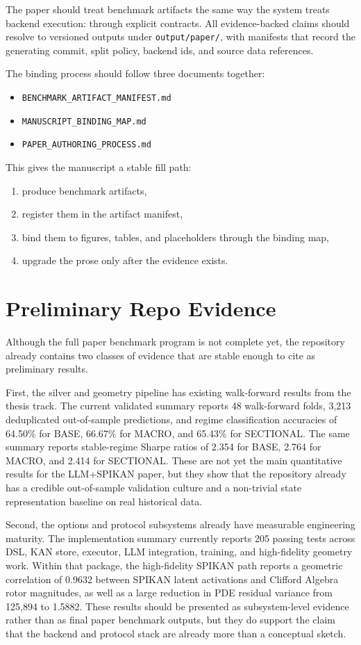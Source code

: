 \documentclass[11pt]{article}
\begin{document}
The paper should treat benchmark artifacts the same way the system treats
backend execution: through explicit contracts. All evidence-backed claims should
resolve to versioned outputs under \texttt{output/paper/}, with manifests that
record the generating commit, split policy, backend ids, and source data
references.

The binding process should follow three documents together:
\begin{itemize}[leftmargin=*]
  \item \texttt{BENCHMARK\_ARTIFACT\_MANIFEST.md}
  \item \texttt{MANUSCRIPT\_BINDING\_MAP.md}
  \item \texttt{PAPER\_AUTHORING\_PROCESS.md}
\end{itemize}

This gives the manuscript a stable fill path:
\begin{enumerate}[leftmargin=*]
  \item produce benchmark artifacts,
  \item register them in the artifact manifest,
  \item bind them to figures, tables, and placeholders through the binding map,
  \item upgrade the prose only after the evidence exists.
\end{enumerate}

\section{Preliminary Repo Evidence}

Although the full paper benchmark program is not complete yet, the repository
already contains two classes of evidence that are stable enough to cite as
preliminary results.

First, the silver and geometry pipeline has existing walk-forward results from
the thesis track. The current validated summary reports 48 walk-forward folds,
3{,}213 deduplicated out-of-sample predictions, and regime classification
accuracies of 64.50\% for BASE, 66.67\% for MACRO, and 65.43\% for SECTIONAL.
The same summary reports stable-regime Sharpe ratios of 2.354 for BASE, 2.764
for MACRO, and 2.414 for SECTIONAL. These are not yet the main quantitative
results for the LLM+SPIKAN paper, but they show that the repository already has
a credible out-of-sample validation culture and a non-trivial state
representation baseline on real historical data.

Second, the options and protocol subsystems already have measurable engineering
maturity. The implementation summary currently reports 205 passing tests across
DSL, KAN store, executor, LLM integration, training, and high-fidelity geometry
work. Within that package, the high-fidelity SPIKAN path reports a geometric
correlation of 0.9632 between SPIKAN latent activations and Clifford Algebra
rotor magnitudes, as well as a large reduction in PDE residual variance from
125{,}894 to 1.5882. These results should be presented as subsystem-level
evidence rather than as final paper benchmark outputs, but they do support the
claim that the backend and protocol stack are already more than a conceptual
sketch.
\end{document}
